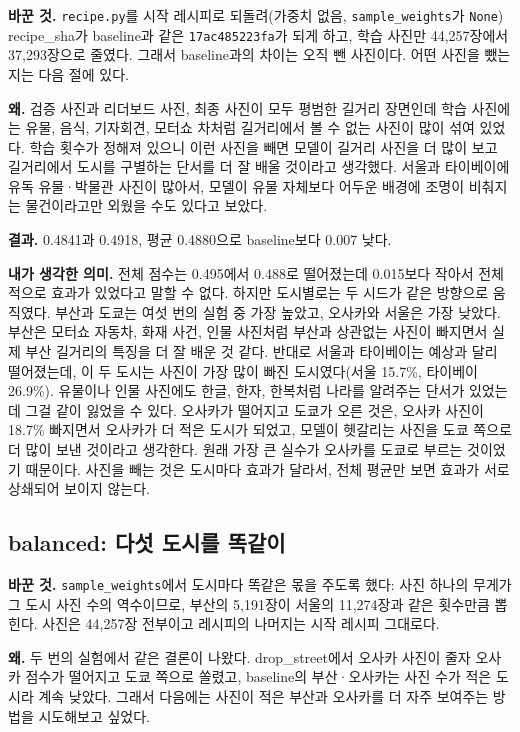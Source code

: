 \documentclass[11pt]{article}
\begin{document}
\textbf{바꾼 것.} \texttt{recipe.py}를 시작 레시피로 되돌려(가중치 없음,
\texttt{sample\_weights}가 \texttt{None}) recipe\_sha가 baseline과 같은
\texttt{17ac485223fa}가 되게 하고, 학습 사진만 44,257장에서 37,293장으로 줄였다.
그래서 baseline과의 차이는 오직 뺀 사진이다. 어떤 사진을 뺐는지는 다음 절에 있다.

\textbf{왜.} 검증 사진과 리더보드 사진, 최종 사진이 모두 평범한 길거리 장면인데
학습 사진에는 유물, 음식, 기자회견, 모터쇼 차처럼 길거리에서 볼 수 없는 사진이 많이
섞여 있었다. 학습 횟수가 정해져 있으니 이런 사진을 빼면 모델이 길거리 사진을 더
많이 보고 길거리에서 도시를 구별하는 단서를 더 잘 배울 것이라고 생각했다. 서울과
타이베이에 유독 유물·박물관 사진이 많아서, 모델이 유물 자체보다 어두운 배경에
조명이 비춰지는 물건이라고만 외웠을 수도 있다고 보았다.

\textbf{결과.} 0.4841과 0.4918, 평균 0.4880으로 baseline보다 0.007 낮다.

\textbf{내가 생각한 의미.} 전체 점수는 0.495에서 0.488로 떨어졌는데 0.015보다
작아서 전체적으로 효과가 있었다고 말할 수 없다. 하지만 도시별로는 두 시드가 같은
방향으로 움직였다. 부산과 도쿄는 여섯 번의 실험 중 가장 높았고, 오사카와 서울은
가장 낮았다. 부산은 모터쇼 자동차, 화재 사건, 인물 사진처럼 부산과 상관없는 사진이
빠지면서 실제 부산 길거리의 특징을 더 잘 배운 것 같다. 반대로 서울과 타이베이는
예상과 달리 떨어졌는데, 이 두 도시는 사진이 가장 많이 빠진 도시였다(서울 15.7\%,
타이베이 26.9\%). 유물이나 인물 사진에도 한글, 한자, 한복처럼 나라를 알려주는 단서가
있었는데 그걸 같이 잃었을 수 있다. 오사카가 떨어지고 도쿄가 오른 것은, 오사카
사진이 18.7\% 빠지면서 오사카가 더 적은 도시가 되었고, 모델이 헷갈리는 사진을 도쿄
쪽으로 더 많이 보낸 것이라고 생각한다. 원래 가장 큰 실수가 오사카를 도쿄로 부르는
것이었기 때문이다. 사진을 빼는 것은 도시마다 효과가 달라서, 전체 평균만 보면 효과가
서로 상쇄되어 보이지 않는다.

\subsection*{balanced: 다섯 도시를 똑같이}

\textbf{바꾼 것.} \texttt{sample\_weights}에서 도시마다 똑같은 몫을 주도록 했다:
사진 하나의 무게가 그 도시 사진 수의 역수이므로, 부산의 5,191장이
서울의 11,274장과 같은 횟수만큼 뽑힌다. 사진은 44,257장 전부이고 레시피의 나머지는
시작 레시피 그대로다.

\textbf{왜.} 두 번의 실험에서 같은 결론이 나왔다. drop\_street에서 오사카 사진이
줄자 오사카 점수가 떨어지고 도쿄 쪽으로 쏠렸고, baseline의 부산·오사카는 사진 수가
적은 도시라 계속 낮았다. 그래서 다음에는 사진이 적은 부산과 오사카를 더 자주
보여주는 방법을 시도해보고 싶었다.
\end{document}
